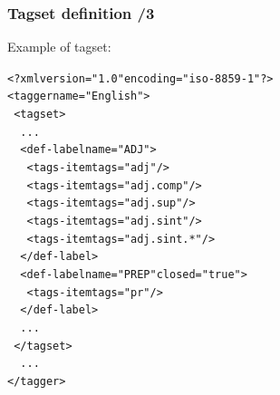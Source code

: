\documentclass{beamer} %
\begin{document}
\begin{frame}
  \frametitle{Tagset definition /3} 

  \begin{exampleblock}{Example of tagset:}
    \begin{footnotesize}
    \begin{alltt}
      <?xml version="1.0" encoding="iso-8859-1"?>\\
      <tagger name="English">\\
      ~<tagset>\\
      ~~...\\
      ~~<def-label name="ADJ">\\
      ~~~<tags-item tags="adj"/>\\
      ~~~<tags-item tags="adj.comp"/>\\
      ~~~<tags-item tags="adj.sup"/> \\
      ~~~<tags-item tags="adj.sint"/>\\
      ~~~<tags-item tags="adj.sint.*"/>\\
      ~~</def-label>\\
      ~~<def-label name="PREP" closed="true">\\
      ~~~<tags-item tags="pr"/>\\
      ~~</def-label>\\
      ~~...\\
      ~</tagset>\\
      ~~...\\
      </tagger>\\
    \end{alltt}
    \end{footnotesize}
  \end{exampleblock}
\end{frame}
\end{document}
